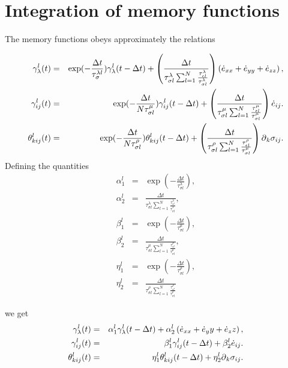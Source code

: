 \documentclass[11pt]{article}
\begin{document}
\section*{Integration of memory functions}
The memory functions  obeys approximately the relations

\begin{eqnarray}
\gamma^l_{\lambda}(t) & = &
            \exp(-\frac{\Delta t}{\tau^{\lambda l}_{\sigma}})\gamma^l_{\lambda}(t-\Delta t)
            +\left(\frac{\Delta t}{\tau^{\lambda}_{\sigma l}
            \sum_{l=1}^N\frac{\tau^{\lambda}_{\epsilon l}}{\tau^{\lambda}_{\sigma l}}}\right)
             \left(\dot{e}_{xx}+ \dot{e}_{yy}+\dot{e}_{zz}\right) ,\nonumber\\
\gamma^l_{ij}(t) & = &
            \exp(-\frac{\Delta t}{N\tau^{\mu}_{\sigma l}})\gamma^l_{ij}(t-\Delta t)
            + \left(\frac{\Delta t}{\tau^{\mu}_{\sigma l}
            \sum_{l=1}^N\frac{\tau^{\mu}_{\epsilon l}}{\tau^{\mu}_{\sigma l}}}\right) \dot{e}_{ij}.\nonumber\\
\theta^l_{kij}(t) & = &
            \exp(-\frac{\Delta t}{N\tau^{\rho}_{\sigma l}})\theta^l_{kij}(t-\Delta t)
            + \left(\frac{\Delta t}{\tau^{\rho}_{\sigma l}
            \sum_{l=1}^N\frac{\tau^{\rho}_{\epsilon l}}{\tau^{\mu}_{\sigma l}}}\right) \mbox{$\partial$}_k \sigma_{ij}.\nonumber\\
\end{eqnarray}
%
Defining the quantities
\begin{eqnarray}
\alpha^l_1 & = & \exp(-\frac{\Delta t}{\tau^{\lambda}_{\sigma l}}),\\
\alpha^l_2 & = & \frac{\Delta t}{\tau^{\lambda}_{\sigma l}\sum_{l=1}^N\frac{\tau^{\lambda}_{\epsilon l}}{\tau^{\lambda}_{\sigma l}}} ,\\
\beta^l_1  & = &\exp(-\frac{\Delta t}{\tau^{\mu}_{\sigma l}}) ,\\
\beta^l_2  & = &\frac{\Delta t}{\tau^{\mu}_{\sigma l}\sum_{l=1}^N\frac{\tau^{\mu}_{\epsilon l}}{\tau^{\mu}_{\sigma l}}},\\
\eta^l_1  & = &\exp(-\frac{\Delta t}{\tau^{\rho}_{\sigma l}}) ,\\
\eta^l_2  & = &\frac{\Delta t}{\tau^{\rho}_{\sigma l}\sum_{l=1}^N\frac{\tau^{\rho}_{\epsilon l}}{\tau^{\rho}_{\sigma l}}} 
\end{eqnarray}

%
we get
\begin{eqnarray}
\gamma^l_{\lambda}(t)  & = &\alpha^l_1 \gamma^l_{\lambda}(t-\Delta t) 
                        + \alpha^l_2\left( \dot{e}_{xx}+ \dot{e}_yy+\dot{e}_zz\right) ,\nonumber \\
\gamma^l_{ij}(t)      & = &\beta^l_1 \gamma^l_{ij}(t - \Delta t) 
                        + \beta^l_2\dot{e}_{ij}.\nonumber\\
\theta^l_{kij}(t)      & = &\eta^l_{1} \theta^l_{kij}(t - \Delta t) 
                        + \eta^l_2\mbox{$\partial$}_k \sigma_{ij}.\nonumber\\
\end{eqnarray}
%
\end{document}
